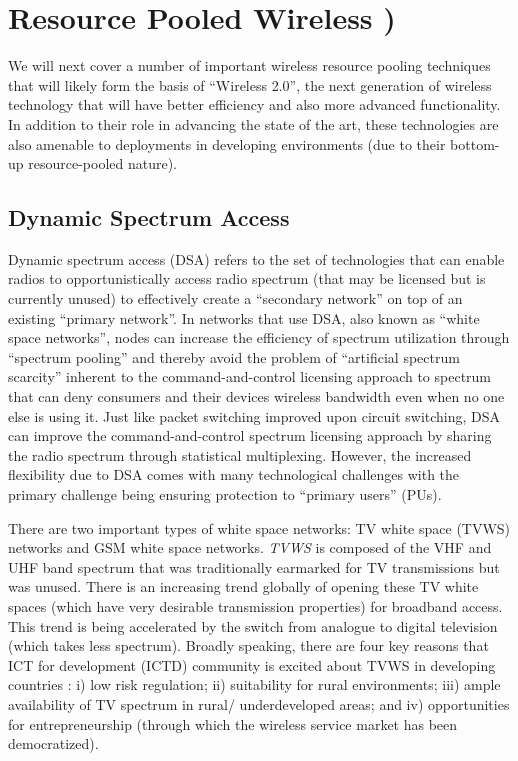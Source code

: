 \documentclass{sigcomm-alternate}
\begin{document}
\section{Resource Pooled Wireless )} 
\label{sec:rpWireless}



We will next cover a number of important wireless resource pooling 
techniques that will likely form the basis of ``Wireless 2.0'', the next generation of wireless technology that will have better efficiency and also more advanced functionality. In addition to their role in advancing the state of the art, these technologies are also amenable to deployments in developing environments (due to their bottom-up resource-pooled nature). 

\subsection{Dynamic Spectrum Access}
\label{dsa}

Dynamic spectrum access (DSA) refers to the set of technologies that can enable radios to opportunistically access radio spectrum (that may be licensed but is currently unused) to effectively create a ``secondary network'' on top of an existing ``primary network''. In networks that use DSA, also known as ``white space networks'', nodes can increase the efficiency of spectrum utilization through ``spectrum pooling'' \cite{weiss2004spectrum} and thereby avoid the problem of ``artificial spectrum scarcity'' inherent to the command-and-control licensing approach to spectrum that can deny consumers and their devices wireless bandwidth even when no one else is using it. Just like packet switching improved upon circuit switching, DSA can improve the command-and-control spectrum licensing approach by sharing the radio spectrum through statistical multiplexing. However, the increased flexibility due to DSA comes with many technological challenges with the primary challenge being ensuring protection to ``primary users'' (PUs). 





There are two important types of white space networks: TV white space (TVWS) networks and GSM white space networks. \textit{TVWS} is composed of the VHF and UHF band spectrum that was traditionally earmarked for TV transmissions but was unused. There is an increasing trend globally of opening these TV white spaces (which have very desirable transmission properties) for broadband access. This trend is being accelerated by the switch from analogue to digital television (which takes less spectrum). Broadly speaking, there are four key reasons that ICT for development (ICTD) community is excited about TVWS in developing countries \cite{Zennaro2013tvws}: i) low risk regulation; ii) suitability for rural environments; iii) ample availability of TV spectrum in rural/ underdeveloped areas; and iv) opportunities for entrepreneurship (through which the wireless service market has been democratized).  
\end{document}
